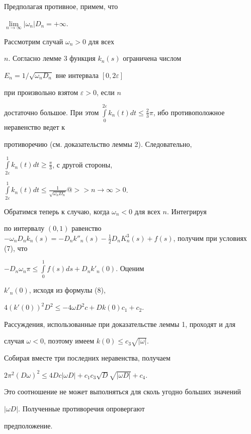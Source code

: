 \begin{pf}


Предполагая противное, примем, что


$\lim\limits_{n\to \infty}|\omega_n|D_n=+\infty$.


Рассмотрим случай $\omega_n>0$ для всех


$n$. Согласно лемме 3 функция $k_n(s)$ ограничена числом


$E_n=1/\sqrt{\omega_n D_n}$ вне интервала $[0,2\varepsilon]$


при произвольно взятом $\varepsilon >0 $, если $n$


достаточно большое. При этом $\int\limits_0^{2\varepsilon}


{k_n(t)dt\le \frac{2}{3}}\pi$, ибо противоположное неравенство ведет к


противоречию (см. доказательство леммы 2). Следовательно,


$\int\limits_{2\varepsilon}^1 k_n(t)dt\ge \frac{\pi}{3}$, с другой стороны,


$\int\limits_{2\varepsilon}^1 k_n(t)dt\le\frac{1}{\sqrt {\omega_nD_n}}


@>>{n\to \infty}>0$.





Обратимся теперь к случаю, когда $\omega_n<0$ для всех $n$. Интегрируя


по интервалу $(0,1)$ равенство $-\omega_nD_n k_n(s)=-D_n k''_n(s)-


\frac{1}{2}D_nK_n^3(s)+f(s)$, получим при условиях (7), что


$-D_n\omega_n\pi\le\int\limits_0^1{f(s)ds}+D_n k'_n(0)$. Оценим


$k'_n(0)$, исходя из формулы (8),


$4({k'(0)})^2D^2\le -4\omega D^2c+Dk(0)c_1+c_2$.





Рассуждения, использованные при доказательстве леммы 1, проходят и для


случая $\omega < 0$, поэтому имеем $k(0)\le c_3\sqrt{| \omega|}$.


Собирая вместе три последних неравенства, получаем


$2\pi^2({D\omega})^2 \le


4D c|{\omega D}|+c_1c_3\sqrt D\sqrt{|{\omega D}|}+c_4$.


Это соотношение не может выполняться для сколь угодно больших значений


$|\omega D|$. Полученные противоречия опровергают


предположение.


\end{pf}





